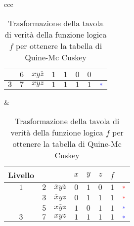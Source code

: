 \documentclass[a4paper]{extarticle}
\begin{document}
\begin{table}[H]
\begin{tabularx}{\textwidth}{ccc}
{\begin{tabular}{c|c|c|ccc|cc}
             & $6$ & $xy\overline{z}$ & $1$ & $1$ & $0$ & $0$\\
             \hline
             $3$ & $7$ & $xyz$ & $1$ & $1$ & $1$ & $1$ & $\color{blue}{\ast}$\\
        \end{tabular}
    }
    &
    {
        \hspace{-1em}
        \setlength{\tabcolsep}{3.5pt}
        \begin{tabular}{c|c|c|ccc|cc}
             \textbf{Livello} & & & $x$ & $y$ & $z$ & $f$\\
             \hline
             $1$ & $2$ & $\overline{x}y\overline{z}$ & $0$ & $1$ & $0$ & $1$ & $\color{red}{\ast}$\\
             \hline
             \parbox{3em}{} &
             $3$ & $\overline{x}yz$ & $0$ & $1$ & $1$ & $1$ & $\color{red}{\ast}$\\
             & $5$ & $x\overline{y}z$ & $1$ & $0$ & $1$ & $1$ & $\color{blue}{\ast}$\\
             \hline
             $3$ & $7$ & $xyz$ & $1$ & $1$ & $1$ & $1$ & $\color{blue}{\ast}$\\
        \end{tabular}
    }
    \end{tabularx}
    \caption{Trasformazione della tavola di verità della funzione logica \(f\) per ottenere la tabella di Quine-Mc Cuskey}
    \label{tab:tavola_verita_Quine_Mc_Cuskey}
\end{table}
\end{document}
